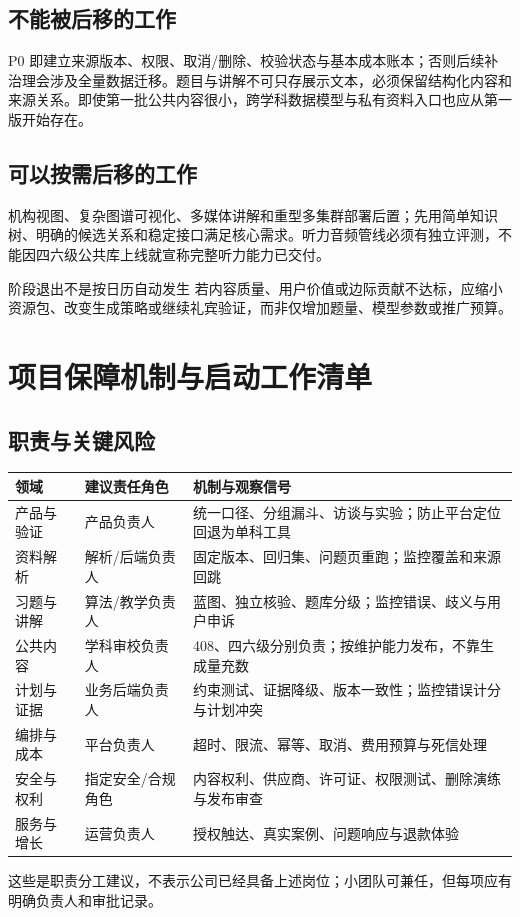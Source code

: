 \documentclass[UTF8,a4paper,11pt,fontset=none]{ctexart}
\newcommand{\cth}[1]{\textbf{\sffamily #1}}
\newcommand{\minor}[1]{{\small\color{Muted}#1}}
\newcommand{\newsec}[1]{\clearpage\section{#1}}
\newenvironment{tbl}{\par\vspace{3pt}\small\noindent\ignorespaces}{\unskip\par\vspace{5pt}}
\begin{document}
\subsection{不能被后移的工作}
P0 即建立来源版本、权限、取消/删除、校验状态与基本成本账本；否则后续补治理会涉及全量数据迁移。题目与讲解不可只存展示文本，必须保留结构化内容和来源关系。即使第一批公共内容很小，跨学科数据模型与私有资料入口也应从第一版开始存在。

\subsection{可以按需后移的工作}
机构视图、复杂图谱可视化、多媒体讲解和重型多集群部署后置；先用简单知识树、明确的候选关系和稳定接口满足核心需求。听力音频管线必须有独立评测，不能因四六级公共库上线就宣称完整听力能力已交付。

\begin{insight}{阶段退出不是按日历自动发生}
若内容质量、用户价值或边际贡献不达标，应缩小资源包、改变生成策略或继续礼宾验证，而非仅增加题量、模型参数或推广预算。
\end{insight}

\newsec{项目保障机制与启动工作清单}
\subsection{职责与关键风险}
\begin{tbl}
\begin{tabularx}{\linewidth}{@{}L{23mm}L{26mm}Y@{}}
\toprule
\cth{领域}&\cth{建议责任角色}&\cth{机制与观察信号}\\\midrule
产品与验证&产品负责人&统一口径、分组漏斗、访谈与实验；防止平台定位回退为单科工具\\
资料解析&解析/后端负责人&固定版本、回归集、问题页重跑；监控覆盖和来源回跳\\
习题与讲解&算法/教学负责人&蓝图、独立核验、题库分级；监控错误、歧义与用户申诉\\
公共内容&学科审校负责人&408、四六级分别负责；按维护能力发布，不靠生成量充数\\
计划与证据&业务后端负责人&约束测试、证据降级、版本一致性；监控错误计分与计划冲突\\
编排与成本&平台负责人&超时、限流、幂等、取消、费用预算与死信处理\\
安全与权利&指定安全/合规角色&内容权利、供应商、许可证、权限测试、删除演练与发布审查\\
服务与增长&运营负责人&授权触达、真实案例、问题响应与退款体验\\
\bottomrule
\end{tabularx}
\end{tbl}
\minor{这些是职责分工建议，不表示公司已经具备上述岗位；小团队可兼任，但每项应有明确负责人和审批记录。}
\end{document}
